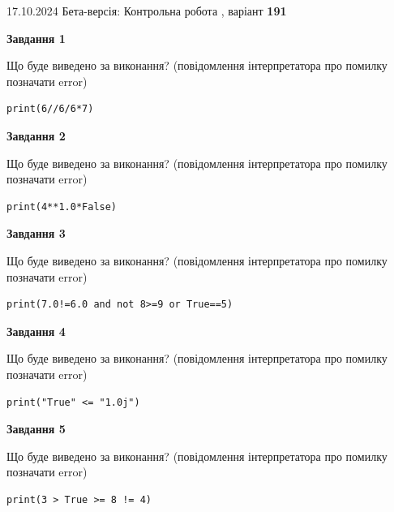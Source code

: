 \documentclass[12pt, ukrainian]{article}
\begin{document}
{\Large{17.10.2024 Бета-версія: Контрольна робота , варіант  \No \textbf { 191 }\par}}
{
\begin {large}
{\begin {center}\textbf{Завдання 1}\end {center}}

Що буде виведено за виконання? (повідомлення інтерпретатора про помилку позначати error)\par
\begin{verbatim}
print(6//6/6*7)
\end{verbatim}

{\begin {center}\textbf{Завдання 2}\end {center}}

Що буде виведено за виконання? (повідомлення інтерпретатора про помилку позначати error)\par
\begin{verbatim}
print(4**1.0*False)
\end{verbatim}

{\begin {center}\textbf{Завдання 3}\end {center}}

Що буде виведено за виконання? (повідомлення інтерпретатора про помилку позначати error)\par
\begin{verbatim}
print(7.0!=6.0 and not 8>=9 or True==5)
\end{verbatim}

{\begin {center}\textbf{Завдання 4}\end {center}}

Що буде виведено за виконання? (повідомлення інтерпретатора про помилку позначати error)\par
\begin{verbatim}
print("True" <= "1.0j")
\end{verbatim}

{\begin {center}\textbf{Завдання 5}\end {center}}

Що буде виведено за виконання? (повідомлення інтерпретатора про помилку позначати error)\par
\begin{verbatim}
print(3 > True >= 8 != 4)
\end{verbatim}


\end{large}}
\end{document}
